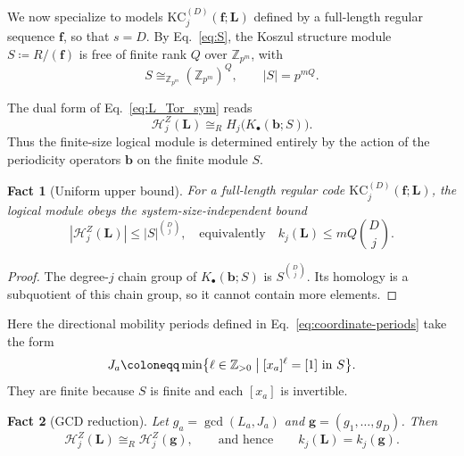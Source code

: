 \documentclass[aps,prx,english,superscriptaddress,twocolumn,tightenlines,showpacs,longbibliography,floatfix,amsfonts]{revtex4-2}
\newtheorem{fact}{Fact}
\theoremstyle{remark}
\theoremstyle{definition}
\begin{document}
We now specialize to models
\(\mathrm{KC}_j^{(D)}(\mathbf{f};\mathbf{L})\)
defined by a full-length regular sequence \(\mathbf f\), so that \(s=D\).
By Eq.~\eqref{eq:S}, the Koszul structure module
\(S\coloneqq R/(\mathbf f)\) is free of finite rank \(Q\) over
\(\mathbb Z_{p^m}\), with
\begin{equation}
	S\cong_{\mathbb Z_{p^m}}(\mathbb Z_{p^m})^Q,
	\qquad
	|S|=p^{mQ}.
	\label{eq:full-length-structure-size}
\end{equation}

The dual form of Eq.~\eqref{eq:L_Tor_sym} reads
\begin{equation}
	\mathcal H_j^Z(\mathbf L)
	\cong_R H_j\bigl(K_\bullet(\mathbf b;S)\bigr).
	\label{eq:LZ-full-length-KbS}
\end{equation}
Thus the finite-size logical module is determined entirely by the action of
the periodicity operators \(\mathbf b\) on the finite module \(S\).

\begin{fact}[Uniform upper bound]
	\label{fact:logical-upper-bound}
	For a full-length regular code
	\(\mathrm{KC}_j^{(D)}(\mathbf f;\mathbf L)\), the
	logical module obeys the system-size-independent bound
	\begin{equation}
		|\mathcal H_j^Z(\mathbf L)|
		\leq
		|S|^{\binom{D}{j}},
		\quad\text{equivalently}\quad
		k_j(\mathbf L)\leq mQ\binom{D}{j}.
		\label{eq:logical-upper-bound}
	\end{equation}
\end{fact}

\begin{proof}
	The degree-\(j\) chain group of \(K_\bullet(\mathbf b;S)\) is
	\(S^{\binom{D}{j}}\). Its homology is a subquotient of this chain group,
	so it cannot contain more elements.
\end{proof}

Here the directional mobility periods defined in
Eq.~\eqref{eq:coordinate-periods} take the form
\begin{equation}
	J_a\coloneqq
	\min\bigl\{\ell\in\mathbb Z_{>0}\bigm|
	[x_a]^\ell=[1]\text{ in }S\bigr\}.
	\label{eq:regular-coordinate-periods}
\end{equation}
They are finite because \(S\) is finite and each \([x_a]\) is invertible.

\begin{fact}[GCD reduction]
	\label{fact:logical-gcd-reduction}
	Let \(g_a=\gcd(L_a,J_a)\) and
	\(\mathbf g=(g_1,\dots,g_D)\). Then
	\begin{equation}
		\mathcal H_j^Z(\mathbf L)
		\cong_R\mathcal H_j^Z(\mathbf g),
		\qquad\text{and hence}\qquad
		k_j(\mathbf L)=k_j(\mathbf g).
		\label{eq:logical-gcd-reduction}
	\end{equation}
\end{fact}
\end{document}
